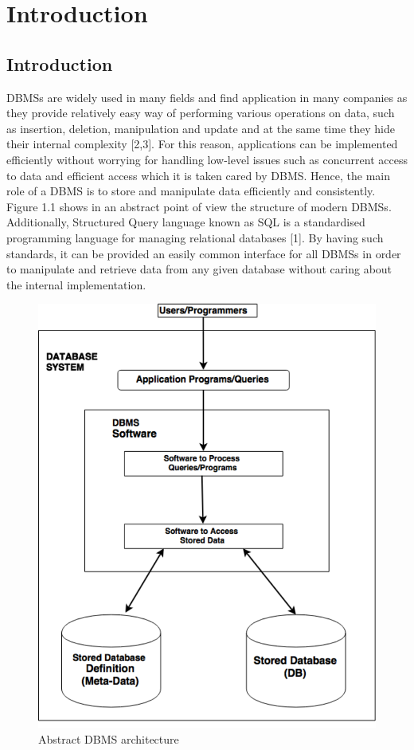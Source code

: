 \chapter{Introduction}
 \section{Introduction}


DBMSs are widely used in many fields and find application in many companies as they provide relatively easy way of performing various operations on data, such as insertion, deletion, manipulation and update and at the same time they hide their internal complexity [2,3]. For this reason, applications can be implemented efficiently without worrying for handling low-level issues  such as concurrent access to data and efficient access which it is taken cared by DBMS. Hence, the main role of a DBMS is to store and manipulate data efficiently and consistently. Figure 1.1 shows in an abstract point of view the structure of modern DBMSs. Additionally, Structured Query language known as SQL is a standardised programming language for managing relational databases [1]. By having such standards, it can be provided an easily common interface for all DBMSs in order to manipulate and retrieve data from any given database without caring about the internal implementation. 


 \begin{figure} 
      \centering
      \includegraphics[width=\textwidth]{Images/Chapter1/db_arch}
      \caption{Abstract DBMS architecture}
      \label{fig:counting-methods}
    \end{figure}

